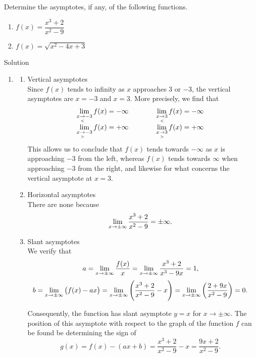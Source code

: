 \begin{example}
Determine the asymptotes, if any, of the following functions.
\begin{multicols}{2}
\begin{enumerate}
\item $f(x)=\dfrac{x^3+2}{x^2-9}$
\item $f(x)=\sqrt{x^2-4x+3}$
\end{enumerate}
\end{multicols}

Solution 

\begin{enumerate}
\item 
\begin{enumerate}
\item Vertical asymptotes\\

Since $f(x)$ tends to infinity as $x$ approaches 3 or $-3$, the vertical asymptotes are $x=-3$ and $x=3$. More precisely, we find that 
\[
\begin{array}{ll}
\displaystyle\lim_{x\underset{<}{\rightarrow}-3} f(x) = - \infty  &\quad \quad \quad \displaystyle\lim_{x\underset{<}{\rightarrow}3} f(x) = - \infty \\
\displaystyle\lim_{x\underset{>}{\rightarrow}-3} f(x) = + \infty  &\quad \quad  \quad \displaystyle\lim_{x\underset{>}{\rightarrow}3} f(x) = + \infty
\end{array}
\]
This allows us to conclude that $f(x)$ tends towards $-\infty$ as $x$ is approaching $-3$ from the left, whereas $f(x)$ tends towards $\infty$ when approaching $-3$ from the right, and likewise for what concerns the vertical asymptote at $x=3$. 
\item Horizontal asymptotes\\

There are none because
\[ \displaystyle\lim_{x \rightarrow \pm \infty} \dfrac{x^3+2}{x^2-9} = \pm \infty. \]

\item Slant asymptotes\\

We verify that 
\[a = \displaystyle\lim_{x \rightarrow \pm \infty} \dfrac{f(x)}{x} = \displaystyle\lim_{x \rightarrow \pm \infty} \dfrac{x^3+2}{x^3-9x} = 1, \]
\[b = \displaystyle\lim_{x \rightarrow \pm \infty} \left(f(x) - ax \right) = \displaystyle\lim_{x \rightarrow \pm \infty} \left( \dfrac{x^3+2}{x^2-9} - x  \right) = \displaystyle\lim_{x \rightarrow \pm \infty} \left( \dfrac{2+9x}{x^2-9}\right) = 0.  \]

Consequently, the function has slant asymptote $y=x$ for $x \rightarrow \pm \infty$. The position of this asymptote with respect to the graph of the function $f$ can be found be determining the sign of 
\[
g(x) = f(x) - (ax+b)  = \dfrac{x^3+2}{x^2-9} - x =  \dfrac{9x+2}{x^2-9} .
\]



\end{enumerate}
\end{enumerate}
\end{example}
